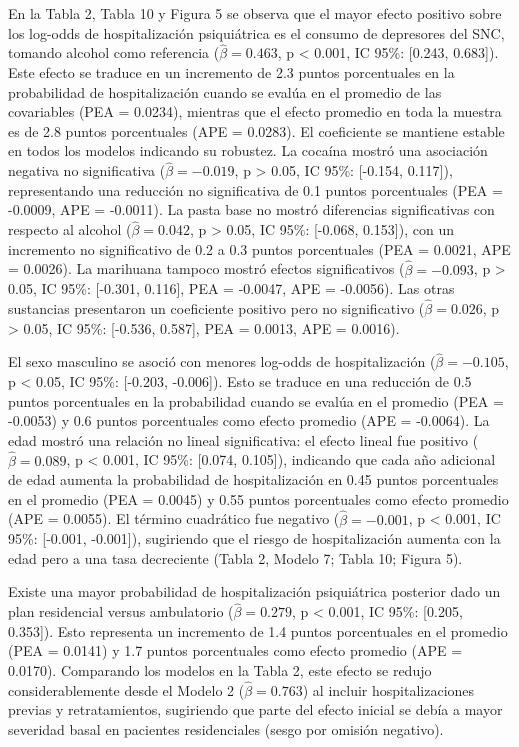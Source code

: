 \documentclass[
  spanish,
  10pt,
]{article}
\begin{document}
En la Tabla 2, Tabla 10 y Figura 5 se observa que el mayor efecto
positivo sobre los log-odds de hospitalización psiquiátrica es el
consumo de depresores del SNC, tomando alcohol como referencia
(\(\hat{\beta} = 0.463\), p \textless{} 0.001, IC 95\%: {[}0.243,
0.683{]}). Este efecto se traduce en un incremento de 2.3 puntos
porcentuales en la probabilidad de hospitalización cuando se evalúa en
el promedio de las covariables (PEA = 0.0234), mientras que el efecto
promedio en toda la muestra es de 2.8 puntos porcentuales (APE =
0.0283). El coeficiente se mantiene estable en todos los modelos
indicando su robustez. La cocaína mostró una asociación negativa no
significativa (\(\hat{\beta} = -0.019\), p \textgreater{} 0.05, IC 95\%:
{[}-0.154, 0.117{]}), representando una reducción no significativa de
0.1 puntos porcentuales (PEA = -0.0009, APE = -0.0011). La pasta base no
mostró diferencias significativas con respecto al alcohol
(\(\hat{\beta} = 0.042\), p \textgreater{} 0.05, IC 95\%: {[}-0.068,
0.153{]}), con un incremento no significativo de 0.2 a 0.3 puntos
porcentuales (PEA = 0.0021, APE = 0.0026). La marihuana tampoco mostró
efectos significativos (\(\hat{\beta} = -0.093\), p \textgreater{} 0.05,
IC 95\%: {[}-0.301, 0.116{]}, PEA = -0.0047, APE = -0.0056). Las otras
sustancias presentaron un coeficiente positivo pero no significativo
(\(\hat{\beta} = 0.026\), p \textgreater{} 0.05, IC 95\%: {[}-0.536,
0.587{]}, PEA = 0.0013, APE = 0.0016).

El sexo masculino se asoció con menores log-odds de hospitalización
(\(\hat{\beta} = -0.105\), p \textless{} 0.05, IC 95\%: {[}-0.203,
-0.006{]}). Esto se traduce en una reducción de 0.5 puntos porcentuales
en la probabilidad cuando se evalúa en el promedio (PEA = -0.0053) y 0.6
puntos porcentuales como efecto promedio (APE = -0.0064). La edad mostró
una relación no lineal significativa: el efecto lineal fue positivo
(\(\hat{\beta} = 0.089\), p \textless{} 0.001, IC 95\%: {[}0.074,
0.105{]}), indicando que cada año adicional de edad aumenta la
probabilidad de hospitalización en 0.45 puntos porcentuales en el
promedio (PEA = 0.0045) y 0.55 puntos porcentuales como efecto promedio
(APE = 0.0055). El término cuadrático fue negativo
(\(\hat{\beta} = -0.001\), p \textless{} 0.001, IC 95\%: {[}-0.001,
-0.001{]}), sugiriendo que el riesgo de hospitalización aumenta con la
edad pero a una tasa decreciente (Tabla 2, Modelo 7; Tabla 10; Figura
5).

Existe una mayor probabilidad de hospitalización psiquiátrica posterior
dado un plan residencial versus ambulatorio (\(\hat{\beta} = 0.279\), p
\textless{} 0.001, IC 95\%: {[}0.205, 0.353{]}). Esto representa un
incremento de 1.4 puntos porcentuales en el promedio (PEA = 0.0141) y
1.7 puntos porcentuales como efecto promedio (APE = 0.0170). Comparando
los modelos en la Tabla 2, este efecto se redujo considerablemente desde
el Modelo 2 (\(\hat{\beta} = 0.763\)) al incluir hospitalizaciones
previas y retratamientos, sugiriendo que parte del efecto inicial se
debía a mayor severidad basal en pacientes residenciales (sesgo por
omisión negativo).
\end{document}
